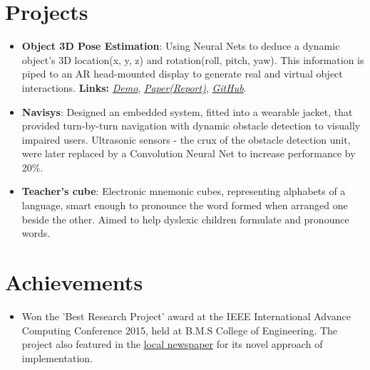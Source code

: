 \documentclass[letterpaper,11pt]{article}
\newcommand{\resumeItem}[2]{
  \item\small{
    \textbf{#1}{: #2 \vspace{-2pt}}
  }
}
\newcommand{\resumePoint}[1]{
  \item\small{#1}
}
\newcommand{\resumeSubItem}[2]{\resumeItem{#1}{#2}\vspace{-4pt}}
\newcommand{\resumeSubHeadingListStart}{\begin{itemize}[leftmargin=*]}
\newcommand{\resumeSubHeadingListEnd}{\end{itemize}\vspace{-10pt}}
\begin{document}
%

\section{Projects}
  \resumeSubHeadingListStart
    \resumeSubItem{Object 3D Pose Estimation}
      {Using Neural Nets to deduce a dynamic object\rq s 3D location(x, y, z) and rotation(roll, pitch, yaw). This information is piped to an AR head-mounted display to generate real and virtual object interactions. \textbf{Links:}
      \href{https://drive.google.com/file/d/1kCepKQxR73tUTLuvmd1YL3sIbj1GxDdc/view?usp=sharing}{\textit{Demo}}, \href{https://drive.google.com/file/d/1mRwSJ8p2-g-gtBGl1A8seRB8SojWQphm/view?usp=sharing}{\textit{Paper(Report)}}, \href{https://github.com/nikhilsu/Object-location-detection}{\textit{GitHub}}.}
    \resumeSubItem{Navisys}
      {Designed an embedded system, fitted into a wearable jacket, that provided turn-by-turn navigation with dynamic obstacle detection to visually impaired users. Ultrasonic sensors - the crux of the obstacle detection unit, were later replaced by a Convolution Neural Net to increase performance by 20\%.}
    \resumeSubItem{Teacher\rq s cube}
      {Electronic mnemonic cubes, representing alphabets of a language, smart enough to pronounce the word formed when arranged one beside the other. Aimed to help dyslexic children formulate and pronounce words.}
    \resumeSubHeadingListEnd

\section{Achievements}
  \resumeSubHeadingListStart
    \resumePoint{Won the 'Best Research Project' award at the IEEE International Advance Computing Conference 2015, held at B.M.S College of Engineering. The project also featured in the \href{https://drive.google.com/open?id=0B0vNhKZyi8qyam1fQ3lfaE1hMkE}{local newspaper} for its novel approach of implementation.}
  \resumeSubHeadingListEnd
\end{document}
